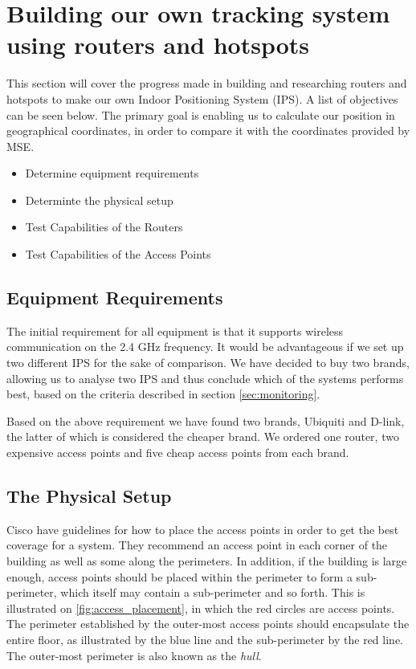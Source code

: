 \section{Building our own tracking system using routers and hotspots} \label{sec:ourSys}
This section will cover the progress made in building and researching routers and hotspots to make our own Indoor Positioning System (IPS). A list of objectives can be seen below. The primary goal is enabling us to calculate our position in geographical coordinates, in order to compare it with the coordinates provided by MSE.

\begin{itemize}
	\item Determine equipment requirements
	\item Determinte the physical setup
	\item Test Capabilities of the Routers
	\item Test Capabilities of the Access Points
\end{itemize}

\subsection*{Equipment Requirements}
The initial requirement for all equipment is that it supports wireless communication on the 2.4 GHz frequency. It would be advantageous if we set up two different IPS for the sake of comparison. We have decided to buy two brands, allowing us to analyse two IPS and thus conclude which of the systems performs best, based on the criteria described in section \ref{sec:monitoring}.

Based on the above requirement we have found two brands, Ubiquiti and D-link, the latter of which is considered the cheaper brand. We ordered one router, two expensive access points and five cheap access points from each brand.

\subsection*{The Physical Setup}
Cisco\cite{access_point_placement} have guidelines for how to place the access points in order to get the best coverage for a system. They recommend an access point in each corner of the building as well as some along the perimeters. In addition, if the building is large enough, access points should be placed within the perimeter to form a sub-perimeter, which itself may contain a sub-perimeter and so forth. This is illustrated on \cref{fig:access_placement}, in which the red circles are access points. The perimeter established by the outer-most access points should encapsulate the entire floor, as illustrated by the blue line and the sub-perimeter by the red line. The outer-most perimeter is also known as the \textit{hull}\cite{access_point_placement}.

